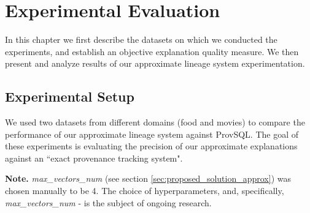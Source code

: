\chapter{Experimental Evaluation}
\label{chap:experimental_evaluation}

In this chapter we first describe the datasets on which we conducted the experiments, and establish an objective explanation quality measure. We then present and analyze results of our approximate lineage system experimentation.


\section{Experimental Setup}\label{sec:evaluation-setup}
We used two datasets from different domains (food and movies) to compare the performance of our approximate lineage system against ProvSQL. The goal of these experiments is evaluating the precision of our approximate explanations against an ``exact provenance tracking system".
\par\textbf{Note.} \textit{max\_vectors\_num} (see section \ref{sec:proposed_solution_approx}) was chosen manually to be 4. The choice of hyperparameters, and, specifically, \textit{max\_vectors\_num} - is the subject of ongoing research.\\

